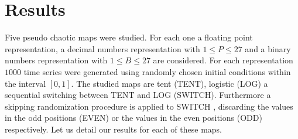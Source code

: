 \section{Results}\label{sec:resultados}
Five pseudo chaotic maps were studied. For each one a floating point representation, a decimal numbers representation with $1\leq P \leq 27$ and a binary numbers representation with $1\leq B \leq 27$ are considered. For each representation $1000$ time series were generated using randomly chosen initial conditions within the interval $[0,1]$. 
The studied maps are tent (TENT), logistic (LOG) a sequential switching between TENT and LOG (SWITCH). Furthermore a skipping randomization procedure is applied to SWITCH \cite{DeMicco2008}, discarding the values in the odd positions (EVEN) or the values in the even positions (ODD) respectively. Let us detail our results for each of these maps. 
